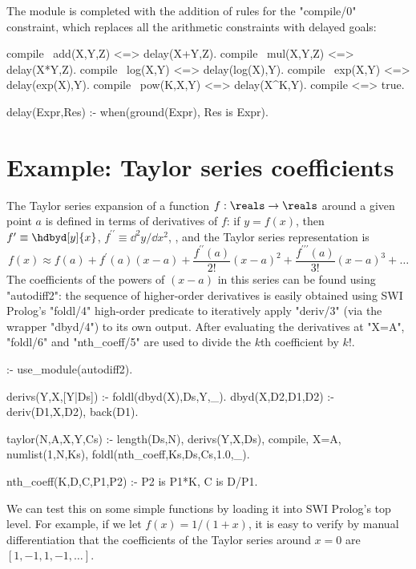 The module is completed with the addition of rules for the "compile/0" constraint, which
replaces all the arithmetic constraints with delayed goals:
\begin{prolog-framed}[name=adtwo,firstnumber=43]
	compile \ add(X,Y,Z) <=> delay(X+Y,Z).
	compile \ mul(X,Y,Z) <=> delay(X*Y,Z).
	compile \ log(X,Y)   <=> delay(log(X),Y).
	compile \ exp(X,Y)   <=> delay(exp(X),Y).
	compile \ pow(K,X,Y) <=> delay(X^K,Y).
	compile <=> true.

	delay(Expr,Res) :- when(ground(Expr), Res is Expr).
\end{prolog-framed}

\section{Example: Taylor series coefficients}
The Taylor series expansion of a function $f:\reals\rightarrow\reals$ 
around a given point $a$ is defined in terms of derivatives
of $f$: if $y=f(x)$, then $f^\prime \equiv \hdbyd[y]{x}$,
$f^{\prime\prime} \equiv \dd^2y/\dd x^2$, \etc, and the Taylor series
representation is
\begin{equation}
	f(x) \approx f(a) + f^\prime(a)(x-a) + \frac{f^{\prime\prime}(a)}{2!}(x-a)^2 
										+ \frac{f^{\prime\prime\prime}(a)}{3!}(x-a)^3 + \ldots
\end{equation}
The coefficients of the powers of $(x-a)$ in this series can be found
using "autodiff2": the sequence of
higher-order derivatives is easily obtained using SWI Prolog's "foldl/4"
high-order predicate to iteratively apply "deriv/3" (via the wrapper "dbyd/4")
to its own output.
After evaluating the derivatives at "X=A", "foldl/6" and "nth_coeff/5" are
used to divide the $k$th coefficient by $k!$.
\begin{prolog-framed}[name=taylor,numbers=none]
	:- use_module(autodiff2).

	derivs(Y,X,[Y|Ds]) :- foldl(dbyd(X),Ds,Y,_).
	dbyd(X,D2,D1,D2) :- deriv(D1,X,D2), back(D1).

	taylor(N,A,X,Y,Cs) :-
	   length(Ds,N), 
	   derivs(Y,X,Ds),
	   compile, X=A,
	   numlist(1,N,Ks),
	   foldl(nth_coeff,Ks,Ds,Cs,1.0,_). 

	nth_coeff(K,D,C,P1,P2) :- P2 is P1*K, C is D/P1.
\end{prolog-framed}
We can test this on some simple functions 
by loading it into SWI Prolog's top level.
For example, if we let $f(x) = 1/(1+x)$, it is easy to verify by
manual differentiation that the coefficients of the Taylor series
around $x=0$ are $[1, -1, 1, -1, \ldots]$. 
